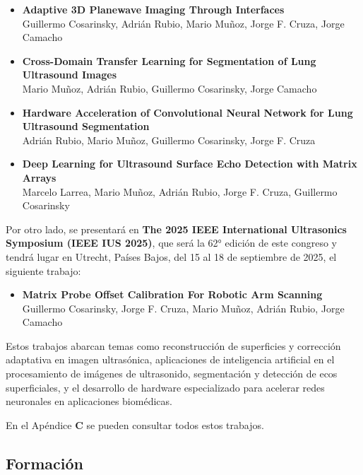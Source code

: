 \documentclass[10pt,a4paper]{article}
\begin{document}
\begin{itemize}
	\item \textbf{Adaptive 3D Planewave Imaging Through Interfaces} \\
	Guillermo Cosarinsky, Adrián Rubio, Mario Muñoz, Jorge F. Cruza, Jorge Camacho
	
	\item \textbf{Cross-Domain Transfer Learning for Segmentation of Lung Ultrasound Images} \\
	Mario Muñoz, Adrián Rubio, Guillermo Cosarinsky, Jorge Camacho
	
	\item \textbf{Hardware Acceleration of Convolutional Neural Network for Lung Ultrasound Segmentation} \\
	Adrián Rubio, Mario Muñoz, Guillermo Cosarinsky, Jorge F. Cruza
	
	\item \textbf{Deep Learning for Ultrasound Surface Echo Detection with Matrix Arrays} \\
	Marcelo Larrea, Mario Muñoz, Adrián Rubio, Jorge F. Cruza, Guillermo Cosarinsky
\end{itemize}

Por otro lado, se presentará en \textbf{The 2025 IEEE International Ultrasonics Symposium (IEEE IUS 2025)}, que será la 62° edición de este congreso y tendrá lugar en Utrecht, Países Bajos, del 15 al 18 de septiembre de 2025, el siguiente trabajo:

\begin{itemize}
	\item \textbf{Matrix Probe Offset Calibration For Robotic Arm Scanning} \\
	Guillermo Cosarinsky, Jorge F. Cruza, Mario Muñoz, Adrián Rubio, Jorge Camacho
\end{itemize}

Estos trabajos abarcan temas como reconstrucción de superficies y corrección adaptativa en imagen ultrasónica, aplicaciones de inteligencia artificial en el procesamiento de imágenes de ultrasonido, segmentación y detección de ecos superficiales, y el desarrollo de hardware especializado para acelerar redes neuronales en aplicaciones biomédicas. 

En el Apéndice \textbf{C} se pueden consultar todos estos trabajos.

\subsection{Formación}
\end{document}
